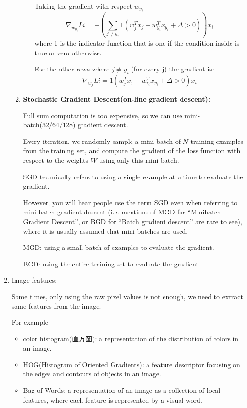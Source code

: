 \documentclass{article}
\numberwithin{equation}{section}
\begin{document}
\begin{CJK}{UTF8}{gbsn}
\begin{enumerate}
\begin{enumerate}
\begin{itemize}
            Taking the gradient with respect \(w_{y_i}\)
            \begin{equation}
                \nabla_{w_{y_i}} Li = - (\sum_{j \neq y_j}1(w^T_j x_j - w^T_{y_i} x_{y_i} + \Delta > 0)) x_i
            \end{equation}
            where 1 is the indicator function that is one if the condition inside is true or zero otherwise. 
        
            For the other rows where \(j \neq y_i \) (for every j) the gradient is:
            \begin{equation}
                \nabla_{w_j} Li = 1(w^T_j x_j - w^T_{y_i} x_{y_i} + \Delta > 0)  x_i
            \end{equation}
        
        \end{itemize}
    
        \item \textbf{Stochastic Gradient Descent(on-line gradient descent):}\par
        Full sum computation is too expensive, so we can use mini-batch(32/64/128) gradient descent.\par
        Every iteration, we randomly sample a mini-batch of \(N\) training examples from the training set, and compute the gradient of the loss function with respect to the weights \(W\) using only this mini-batch.\par
        
        SGD technically refers to using a single example at a time to evaluate the gradient.\par
        However, you will hear people use the term SGD even when referring to mini-batch gradient descent (i.e. mentions of MGD for “Minibatch Gradient Descent”, or BGD for “Batch gradient descent” are rare to see), where it is usually assumed that mini-batches are used.\par
        MGD: using a small batch of examples to evaluate the gradient.\par
        BGD: using the entire training set to evaluate the gradient.\par
    \end{enumerate}

    \item {Image features:}\par
    Some times, only using the raw pixel values is not enough, we need to extract some features from the image.\par
    For example:
    \begin{itemize}
        \item color histogram(直方图): a representation of the distribution of colors in an image.
        \item HOG(Histogram of Oriented Gradients): a feature descriptor focusing on the edges and contours of objects in an image.
        \item Bag of Words: a representation of an image as a collection of local features, where each feature is represented by a visual word.
    \end{itemize}



\end{enumerate}
\end{CJK}
\end{document}
